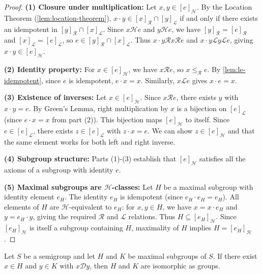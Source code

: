 \begin{proof}
\leanok
\textbf{(1) Closure under multiplication:} Let $x, y \in [e]_{\mathcal{H}}$. By the Location Theorem (\ref{lem:location-theorem}), $x \cdot y \in [x]_{\mathcal{R}} \cap [y]_{\mathcal{L}}$ if and only if there exists an idempotent in $[y]_{\mathcal{R}} \cap [x]_{\mathcal{L}}$. Since $x \mathcal{H} e$ and $y \mathcal{H} e$, we have $[y]_{\mathcal{R}} = [e]_{\mathcal{R}}$ and $[x]_{\mathcal{L}} = [e]_{\mathcal{L}}$, so $e \in [y]_{\mathcal{R}} \cap [x]_{\mathcal{L}}$. Thus $x \cdot y \mathcal{R} x \mathcal{R} e$ and $x \cdot y \mathcal{L} y \mathcal{L} e$, giving $x \cdot y \in [e]_{\mathcal{H}}$.

\textbf{(2) Identity property:} For $x \in [e]_{\mathcal{H}}$, we have $x \mathcal{R} e$, so $x \leq_{\mathcal{R}} e$. By \ref{lem:le-idempotent}, since $e$ is idempotent, $e \cdot x = x$. Similarly, $x \mathcal{L} e$ gives $x \cdot e = x$.

\textbf{(3) Existence of inverses:} Let $x \in [e]_{\mathcal{H}}$. Since $x \mathcal{R} e$, there exists $y$ with $x \cdot y = e$. By Green's Lemma, right multiplication by $x$ is a bijection on $[e]_{\mathcal{L}}$ (since $e \cdot x = x$ from part (2)). This bijection maps $[e]_{\mathcal{H}}$ to itself. Since $e \in [e]_{\mathcal{L}}$, there exists $z \in [e]_{\mathcal{L}}$ with $z \cdot x = e$. We can show $z \in [e]_{\mathcal{H}}$ and that the same element works for both left and right inverse.

\textbf{(4) Subgroup structure:} Parts (1)-(3) establish that $[e]_{\mathcal{H}}$ satisfies all the axioms of a subgroup with identity $e$.

\textbf{(5) Maximal subgroups are $\mathcal{H}$-classes:} Let $H$ be a maximal subgroup with identity element $e_H$. The identity $e_H$ is idempotent (since $e_H \cdot e_H = e_H$). All elements of $H$ are $\mathcal{H}$-equivalent to $e_H$: for $x, y \in H$, we have $x = x \cdot e_H$ and $y = e_H \cdot y$, giving the required $\mathcal{R}$ and $\mathcal{L}$ relations. Thus $H \subseteq [e_H]_{\mathcal{H}}$. Since $[e_H]_{\mathcal{H}}$ is itself a subgroup containing $H$, maximality of $H$ implies $H = [e_H]_{\mathcal{H}}$.
\end{proof}

\begin{lemma}
\label{lem:maximal-subgroups-isomorphic}
Let $S$ be a semigroup and let $H$ and $K$ be maximal subgroups of $S$. If there exist $x \in H$ and $y \in K$ with $x \mathcal{D} y$, then $H$ and $K$ are isomorphic as groups.
\leanok
{}
\end{lemma}

